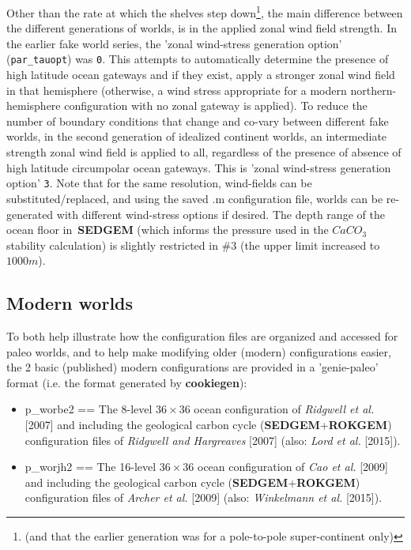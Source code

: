 Other than the rate at which the shelves step down\footnote{(and that the earlier generation was for a pole-to-pole super-continent only)}, the main difference between the different generations of worlds, is in the applied zonal wind field strength. In the earlier fake world series, the 'zonal wind-stress generation option' (\texttt{par\_tauopt}) was \texttt{0}. This attempts to automatically determine the presence of high latitude ocean gateways and if they exist, apply a stronger zonal wind field in that hemisphere (otherwise, a wind stress appropriate for a modern northern-hemisphere configuration with no zonal gateway is applied). To reduce the number of boundary conditions that change and co-vary between different fake worlds, in the second generation of idealized continent worlds, an intermediate strength zonal wind field is applied to all, regardless of the presence of absence of high latitude circumpolar ocean gateways. This is  'zonal wind-stress generation option' \texttt{3}. Note that for the same resolution, wind-fields can be substituted/replaced, and using the saved \textsf{\footnotesize .m} configuration file, worlds can be re-generated with different wind-stress options if desired. The depth range of the ocean floor in\ \textbf{SEDGEM} (which informs the pressure used in the \(CaCO_{3}\) stability calculation) is slightly restricted in \#3 (the upper limit increased to \(1000 m\)).

%
\subsection{Modern worlds}

To both help illustrate how the configuration files are organized and accessed for paleo worlds, and to help make modifying older (modern) configurations easier, the 2 basic (published) modern configurations are provided in a 'genie-paleo' format (i.e. the format generated by \textbf{cookiegen}):
\begin{itemize}[noitemsep]
\vspace{1mm}
\item \textsf{\footnotesize p\_worbe2} == The 8-level \(36\times36\) ocean configuration of \textit{Ridgwell et al.} [2007] and including the geological carbon cycle (\textbf{SEDGEM}+\textbf{ROKGEM}) configuration files of \textit{Ridgwell and Hargreaves} [2007] (also: \textit{Lord et al.} [2015]).
\vspace{1mm}
\item \textsf{\footnotesize p\_worjh2} ==  The 16-level \(36\times36\) ocean configuration of \textit{Cao et al.} [2009] and including the geological carbon cycle (\textbf{SEDGEM}+\textbf{ROKGEM}) configuration files of \textit{Archer et al.} [2009] (also: \textit{Winkelmann et al.} [2015]).
\end{itemize}

